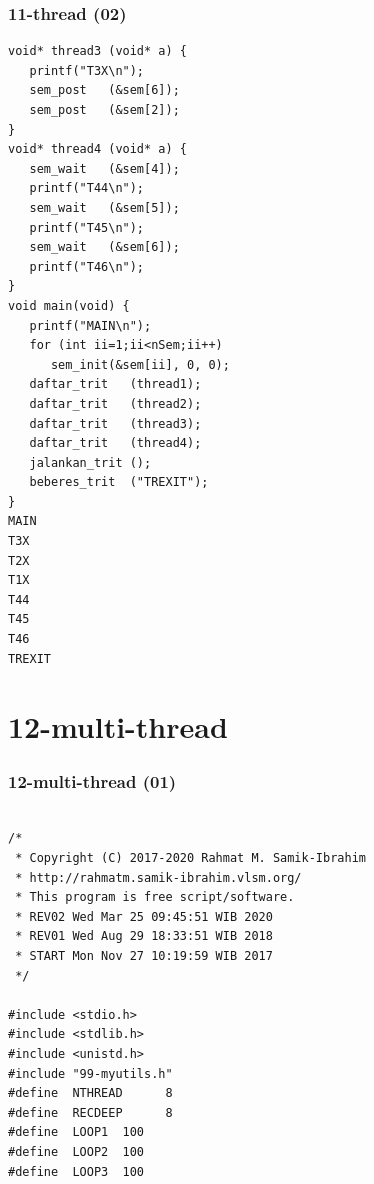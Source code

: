 \documentclass[xcolor=table, notheorems, hyperref={pdfpagelabels=false}]{beamer}
\begin{document}
\begin{frame}[fragile]
\frametitle{11-thread (02)}
\begin{lstlisting}[basicstyle=\ttfamily\tiny]
void* thread3 (void* a) {
   printf("T3X\n");
   sem_post   (&sem[6]);
   sem_post   (&sem[2]);
}
void* thread4 (void* a) {
   sem_wait   (&sem[4]);
   printf("T44\n");
   sem_wait   (&sem[5]);
   printf("T45\n");
   sem_wait   (&sem[6]);
   printf("T46\n");
}
void main(void) {
   printf("MAIN\n");
   for (int ii=1;ii<nSem;ii++)
      sem_init(&sem[ii], 0, 0);
   daftar_trit   (thread1);
   daftar_trit   (thread2);
   daftar_trit   (thread3);
   daftar_trit   (thread4);
   jalankan_trit ();
   beberes_trit  ("TREXIT");
}
MAIN
T3X
T2X
T1X
T44
T45
T46
TREXIT

\end{lstlisting}
\end{frame}

\section{12-multi-thread}
\begin{frame}[fragile]
\frametitle{12-multi-thread (01)}
\begin{lstlisting}[basicstyle=\ttfamily\small]        %  65
% \begin{lstlisting}[basicstyle=\ttfamily\large]        %  54

/*
 * Copyright (C) 2017-2020 Rahmat M. Samik-Ibrahim
 * http://rahmatm.samik-ibrahim.vlsm.org/
 * This program is free script/software.
 * REV02 Wed Mar 25 09:45:51 WIB 2020
 * REV01 Wed Aug 29 18:33:51 WIB 2018
 * START Mon Nov 27 10:19:59 WIB 2017
 */

#include <stdio.h>
#include <stdlib.h>
#include <unistd.h>
#include "99-myutils.h"
#define  NTHREAD      8
#define  RECDEEP      8
#define  LOOP1  100
#define  LOOP2  100
#define  LOOP3  100

\end{lstlisting}
\end{frame}
\end{document}
